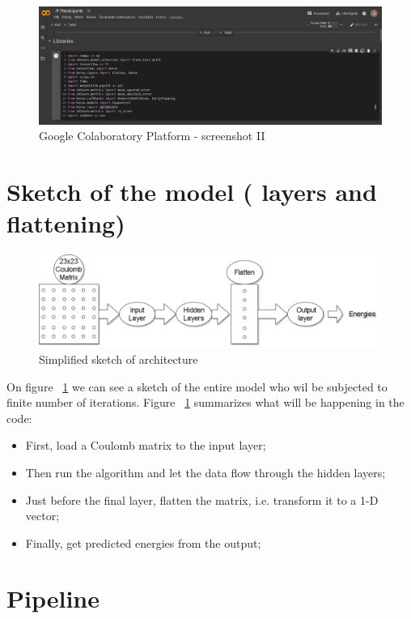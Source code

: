 \documentclass[a4paper,oneside,openright,11pt]{book}
\begin{document}
\begin{figure}[h!]
\centering
\includegraphics[scale=0.4]{DocumentFigures/MyFigures/ImpotLibrariesEnvir.png}
\caption{Google Colaboratory Platform - screenshot II}
\end{figure}


\section{Sketch of the model ( layers and flattening)}

\begin{figure}[h!]
\centering
\includegraphics[scale=0.4]{DocumentFigures/MyFigures/FlattenOperatioNNscheme.png}
\caption{Simplified sketch of architecture}
\label{fig:sketch}
\end{figure}

On figure ~\ref{fig:sketch} we can see a sketch of the entire model who wil be subjected to finite number of iterations. Figure ~\ref{fig:sketch} summarizes what will be happening in the code:

\begin{itemize}
    \item First, load a Coulomb matrix to the input layer;
    \item Then run the algorithm and let the data flow through the hidden layers;
    \item Just before the final layer, flatten the matrix, i.e. transform it to a 1-D vector;
    \item Finally, get predicted energies from the output;
\end{itemize}

\section{Pipeline}
\end{document}

